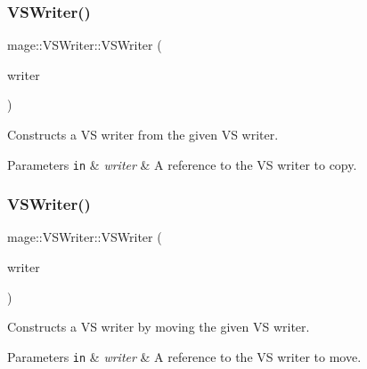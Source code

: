 \subsubsection{\texorpdfstring{V\+S\+Writer()}{VSWriter()}\hspace{0.1cm}{\footnotesize\ttfamily [2/3]}}
{\footnotesize\ttfamily mage\+::\+V\+S\+Writer\+::\+V\+S\+Writer (\begin{DoxyParamCaption}\item[{const \hyperlink{classmage_1_1_v_s_writer}{V\+S\+Writer} \&}]{writer }\end{DoxyParamCaption})\hspace{0.3cm}{\ttfamily [delete]}}

Constructs a VS writer from the given VS writer.


\begin{DoxyParams}[1]{Parameters}
\mbox{\tt in}  & {\em writer} & A reference to the VS writer to copy. \\
\hline
\end{DoxyParams}
\hypertarget{classmage_1_1_v_s_writer_a744553658a13bbe59349058579fafb56}{}\label{classmage_1_1_v_s_writer_a744553658a13bbe59349058579fafb56} 
\subsubsection{\texorpdfstring{V\+S\+Writer()}{VSWriter()}\hspace{0.1cm}{\footnotesize\ttfamily [3/3]}}
{\footnotesize\ttfamily mage\+::\+V\+S\+Writer\+::\+V\+S\+Writer (\begin{DoxyParamCaption}\item[{\hyperlink{classmage_1_1_v_s_writer}{V\+S\+Writer} \&\&}]{writer }\end{DoxyParamCaption})\hspace{0.3cm}{\ttfamily [default]}}

Constructs a VS writer by moving the given VS writer.


\begin{DoxyParams}[1]{Parameters}
\mbox{\tt in}  & {\em writer} & A reference to the VS writer to move. \\
\hline
\end{DoxyParams}
\hypertarget{classmage_1_1_v_s_writer_aa15508560fbef2ef742beb1ff0d96d19}{}\label{classmage_1_1_v_s_writer_aa15508560fbef2ef742beb1ff0d96d19} 
